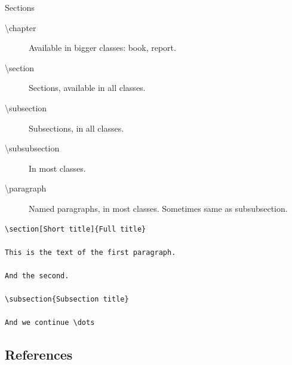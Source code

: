 \begin{frame}
  \begin{block}{Sections}
    \begin{description}
      \item[\textbackslash chapter] Available in bigger classes:
        book, report.

      \item[\textbackslash section] Sections, available in all classes.

      \item[\textbackslash subsection] Subsections, in all classes.

      \item[\textbackslash subsubsection] In most classes.

      \item[\textbackslash paragraph] Named paragraphs, in most classes. 
        Sometimes same as subsubsection.

    \end{description}
  \end{block}
\end{frame}

\begin{frame}[fragile]
  \begin{example}
    \begin{lstlisting}
\section[Short title]{Full title}

This is the text of the first paragraph.

And the second.

\subsection{Subsection title}

And we continue \dots
    \end{lstlisting}
  \end{example}
\end{frame}


\subsection{References}

